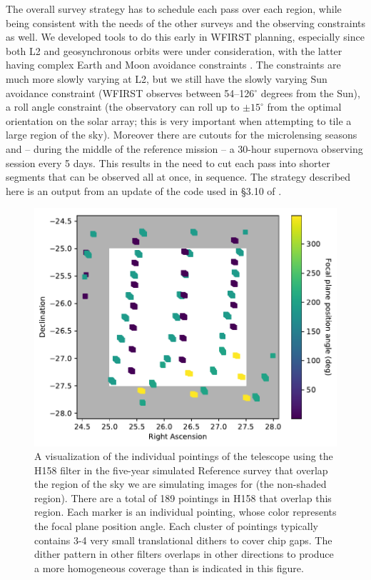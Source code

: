 \documentclass[usenatbib]{mnras}
\begin{document}
The overall survey strategy has to schedule each pass over each region, while being consistent with the needs of the other surveys and the observing constraints as well. We developed tools to do this early in WFIRST planning, especially since both L2 and geosynchronous orbits were under consideration, with the latter having complex Earth and Moon avoidance constraints \citep{2015arXiv150303757S}. The constraints are much more slowly varying at L2, but we still have the slowly varying Sun avoidance constraint (WFIRST observes between 54--126$^\circ$ degrees from the Sun), a roll angle constraint (the observatory can roll up to $\pm 15^\circ$ from the optimal orientation on the solar array; this is very important when attempting to tile a large region of the sky). Moreover there are cutouts for the microlensing seasons and -- during the middle of the reference mission -- a 30-hour supernova observing session every 5 days. This results in the need to cut each pass into shorter segments that can be observed all at once, in sequence. The strategy described here is an output from an update of the code used in \S3.10 of \cite{2015arXiv150303757S}.

\begin{figure}
\begin{center}
\includegraphics[width=\columnwidth]{figures/pointings.pdf}
\end{center}
\caption[]{
A visualization of the individual pointings of the telescope using the H158 filter in the five-year simulated Reference survey that overlap the region of the sky we are simulating images for (the non-shaded region). There are a total of 189 pointings in H158 that overlap this region. Each marker is an individual pointing, whose color represents the focal plane position angle. Each cluster of pointings typically contains 3-4 very small translational dithers to cover chip gaps. The dither pattern in other filters overlaps in other directions to produce a more homogeneous coverage than is indicated in this figure. 
\label{fig:pointings}}
\end{figure}
\end{document}
